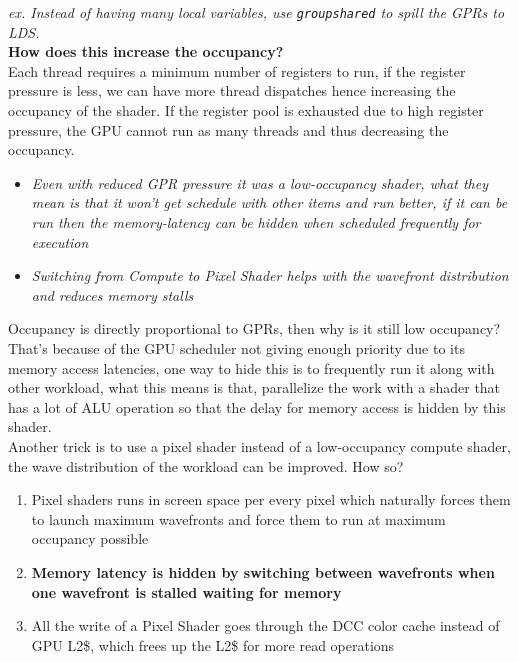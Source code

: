 \documentclass[14pt]{article}
\begin{document}
\textit{ex. Instead of having many local variables, use \lstinline|groupshared| to spill the GPRs to LDS.} \\

\textbf{How does this increase the occupancy?} \\
Each thread requires a minimum number of registers to run, if the register pressure is less, we can have more thread dispatches hence increasing the occupancy of the shader. If the register pool is exhausted due to high register pressure, the GPU cannot run as many threads and thus decreasing the occupancy. \\


\begin{itemize}
	\item \textit{Even with reduced GPR pressure it was a low-occupancy shader, what they mean is that it won't get schedule with other items and run better, if it can be run then the memory-latency can be hidden when scheduled frequently for execution}

	\item \textit{Switching from Compute to Pixel Shader helps with the wavefront distribution and reduces memory stalls}
\end{itemize}

Occupancy is directly proportional to GPRs, then why is it still low occupancy? That's because of the GPU scheduler not giving enough priority due to its memory access latencies, one way to hide this is to frequently run it along with other workload, what this means is that, parallelize the work with a shader that has a lot of ALU operation so that the delay for memory access is hidden by this shader.\\

Another trick is to use a pixel shader instead of a low-occupancy compute shader, the wave distribution of the workload can be improved. How so? \\

\begin{enumerate}

	\item Pixel shaders runs in screen space per every pixel which naturally forces them to launch maximum wavefronts and force them to run at maximum occupancy possible
	\item \textbf{Memory latency is hidden by switching between wavefronts when one wavefront is stalled waiting for memory}	
	\item All the write of a Pixel Shader goes through the DCC color cache instead of GPU L2\$, which frees up the L2\$ for more read operations
	
\end{enumerate}
\end{document}

